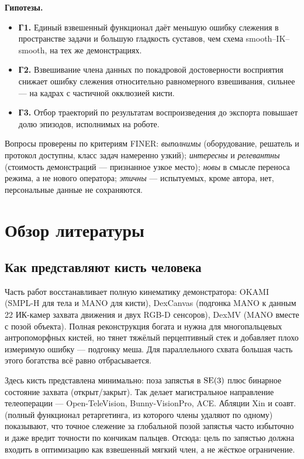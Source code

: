 \documentclass[12pt, a4paper, oneside]{report}
\begin{document}
\noindent\textbf{Гипотезы.}
\begin{itemize}[leftmargin=2.6em]
  \item \textbf{Г1.} Единый взвешенный функционал даёт меньшую ошибку слежения в
        пространстве задачи и большую гладкость суставов, чем схема
        smooth--IK--smooth, на тех же демонстрациях.
  \item \textbf{Г2.} Взвешивание члена данных по покадровой достоверности
        восприятия снижает ошибку слежения относительно равномерного взвешивания,
        сильнее --- на кадрах с частичной окклюзией кисти.
  \item \textbf{Г3.} Отбор траекторий по результатам воспроизведения до экспорта
        повышает долю эпизодов, исполнимых на роботе.
\end{itemize}

Вопросы проверены по критериям FINER: \emph{выполнимы} (оборудование, решатель и
протокол доступны, класс задач намеренно узкий); \emph{интересны} и
\emph{релевантны} (стоимость демонстраций --- признанное узкое место);
\emph{новы} в смысле переноса режима, а не нового оператора; \emph{этичны} ---
испытуемых, кроме автора, нет, персональные данные не сохраняются.

\chapter{Обзор литературы}

\section{Как представляют кисть человека}

Часть работ восстанавливает полную кинематику демонстратора: OKAMI (SMPL-H для
тела и MANO для кисти), DexCanvas (подгонка MANO к данным 22 ИК-камер захвата
движения и двух RGB-D сенсоров), DexMV (MANO вместе с позой объекта). Полная
реконструкция богата и нужна для многопальцевых антропоморфных кистей, но тянет
тяжёлый перцептивный стек и добавляет плохо измеримую ошибку --- подгонку меша.
Для параллельного схвата большая часть этого богатства всё равно отбрасывается.

Здесь кисть представлена минимально: поза запястья в $\mathrm{SE}(3)$ плюс бинарное состояние
захвата (открыт/закрыт). Так делает магистральное направление телеоперации ---
Open-TeleVision, Bunny-VisionPro, ACE. Абляции Xin и соавт. (полный функционал
ретаргетинга, из которого члены удаляют по одному) показывают, что точное слежение
за глобальной позой запястья часто избыточно и даже вредит точности по кончикам
пальцев. Отсюда: цель по запястью должна входить в оптимизацию как взвешенный
мягкий член, а не жёсткое ограничение.
\end{document}
